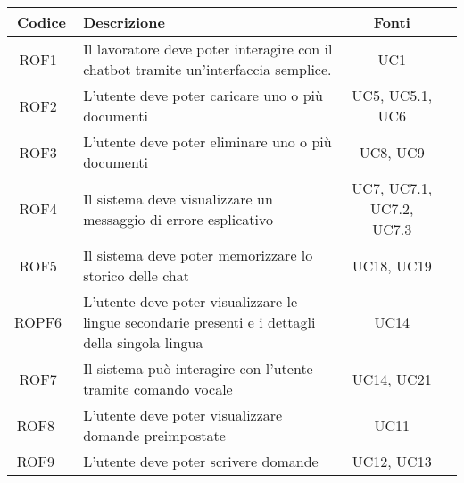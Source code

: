 \documentclass[10pt, a4paper]{article}
\begin{document}
\renewcommand{\arraystretch}{1.5}
\begin{tabularx}{\textwidth}{|c|X|c|c}\hline
\textbf{Codice} & \textbf{Descrizione}  & \textbf{Fonti} \\
\hline ROF1\ & Il lavoratore deve poter interagire con il chatbot tramite un'interfaccia semplice. &  UC1 \\
\hline ROF2\ & L'utente deve poter caricare uno o più documenti & UC5, UC5.1, UC6 \\
\hline ROF3\ & L'utente deve poter eliminare uno o più documenti & UC8, UC9 \\
\hline ROF4\ & Il sistema deve visualizzare un messaggio di errore esplicativo &  UC7, UC7.1, UC7.2, UC7.3 \\
\hline ROF5\ & Il sistema deve poter memorizzare lo storico delle chat & UC18, UC19 \\
\hline ROPF6\ & L’utente deve poter visualizzare le lingue secondarie presenti e i dettagli della singola lingua &  UC14\\
\hline ROF7\ & Il sistema può interagire con l'utente tramite comando vocale & UC14, UC21 \\
\hline ROF8 \ & L'utente deve poter visualizzare domande preimpostate & UC11  \\
\hline ROF9 \ & L'utente deve poter scrivere domande & UC12, UC13  \\
\hline
\end{tabularx}
\end{document}
